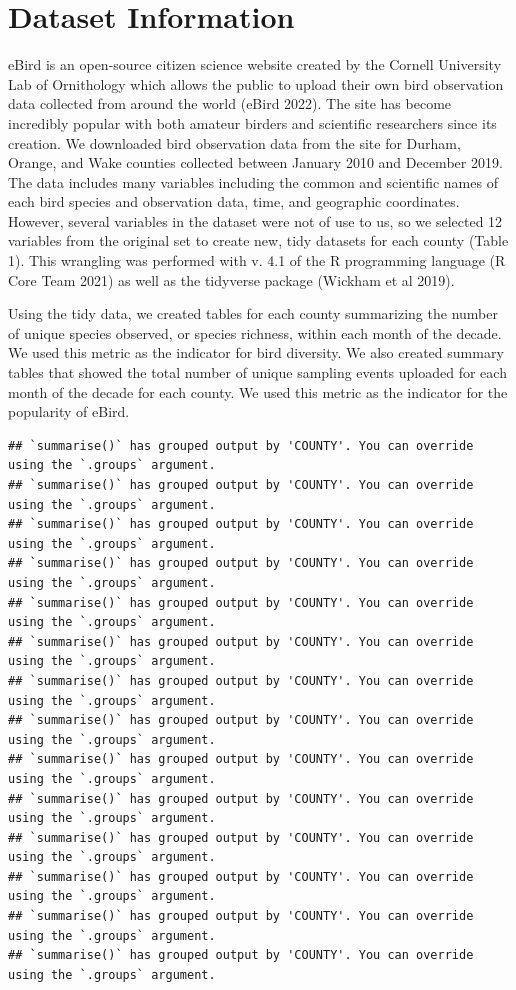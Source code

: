 \documentclass[
  12pt,
]{article}
\begin{document}
\newpage

\hypertarget{dataset-information}{%
\section{Dataset Information}\label{dataset-information}}

eBird is an open-source citizen science website created by the Cornell
University Lab of Ornithology which allows the public to upload their
own bird observation data collected from around the world (eBird 2022).
The site has become incredibly popular with both amateur birders and
scientific researchers since its creation. We downloaded bird
observation data from the site for Durham, Orange, and Wake counties
collected between January 2010 and December 2019. The data includes many
variables including the common and scientific names of each bird species
and observation data, time, and geographic coordinates. However, several
variables in the dataset were not of use to us, so we selected 12
variables from the original set to create new, tidy datasets for each
county (Table 1). This wrangling was performed with v. 4.1 of the R
programming language (R Core Team 2021) as well as the tidyverse package
(Wickham et al 2019).

Using the tidy data, we created tables for each county summarizing the
number of unique species observed, or species richness, within each
month of the decade. We used this metric as the indicator for bird
diversity. We also created summary tables that showed the total number
of unique sampling events uploaded for each month of the decade for each
county. We used this metric as the indicator for the popularity of
eBird.

\begin{verbatim}
## `summarise()` has grouped output by 'COUNTY'. You can override using the `.groups` argument.
## `summarise()` has grouped output by 'COUNTY'. You can override using the `.groups` argument.
## `summarise()` has grouped output by 'COUNTY'. You can override using the `.groups` argument.
## `summarise()` has grouped output by 'COUNTY'. You can override using the `.groups` argument.
## `summarise()` has grouped output by 'COUNTY'. You can override using the `.groups` argument.
## `summarise()` has grouped output by 'COUNTY'. You can override using the `.groups` argument.
## `summarise()` has grouped output by 'COUNTY'. You can override using the `.groups` argument.
## `summarise()` has grouped output by 'COUNTY'. You can override using the `.groups` argument.
## `summarise()` has grouped output by 'COUNTY'. You can override using the `.groups` argument.
## `summarise()` has grouped output by 'COUNTY'. You can override using the `.groups` argument.
## `summarise()` has grouped output by 'COUNTY'. You can override using the `.groups` argument.
## `summarise()` has grouped output by 'COUNTY'. You can override using the `.groups` argument.
## `summarise()` has grouped output by 'COUNTY'. You can override using the `.groups` argument.
## `summarise()` has grouped output by 'COUNTY'. You can override using the `.groups` argument.
\end{verbatim}
\end{document}
